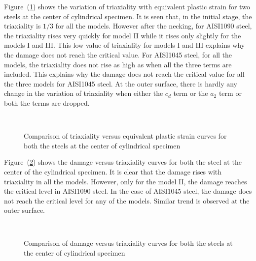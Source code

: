 Figure~(\ref{fig:chap8:equipstrain_vs_triaxiality_1087}) shows the variation of triaxiality with equivalent plastic strain for two steels at the center of cylindrical specimen. It is seen that, in the initial stage, the triaxiality is $1/3$ for all the models. However after the necking, for AISI1090 steel, the triaxiality rises very quickly for model II while it rises only slightly for the models I and III. This low value
of triaxiality for models I and III explains why the damage does not reach the critical value. For AISI1045 steel, for
all the models, the triaxiality does not rise as high as when all the three terms are included. This explains
 why the damage does not reach the critical value for all the three models for AISI1045 steel. At the outer surface, there
is hardly any change in the variation of triaxiality when either the $c_{d}$ term or the $a_{2}$ term or both the terms are
dropped.
\begin{figure}[htb]
\centering {} \\
\caption{Comparison of triaxiality versus equivalent plastic strain curves for both the steels at the center of cylindrical specimen} \label{fig:chap8:equipstrain_vs_triaxiality_1087}
\end{figure}

Figure~(\ref{fig:chap8:triaxiality_damage_1087}) shows the damage versus triaxiality curves for both the steel at the center of the cylindrical specimen.  It is clear that the damage rises with triaxiality in all the models. However, only for the model II, the damage reaches the critical level in AISI1090 steel. In the case of AISI1045 steel, the damage does not reach the critical level for any of the models. Similar trend
is observed at the outer surface.
\begin{figure}[htb]
\centering {} \\
\caption{Comparison of damage versus triaxiality curves for both the steels at the center of cylindrical specimen} \label{fig:chap8:triaxiality_damage_1087}
\end{figure}

